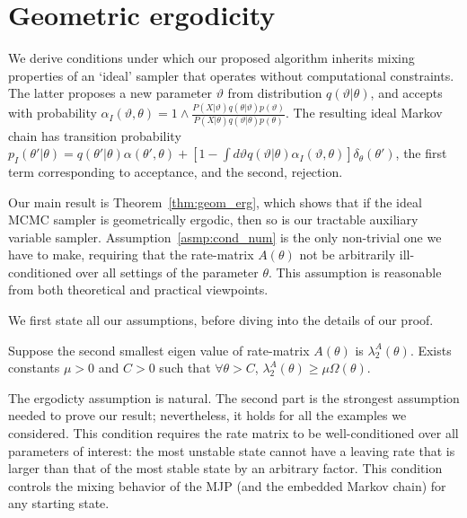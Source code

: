 \newpage
\section{Geometric ergodicity}
We derive conditions under which our proposed algorithm
inherits mixing properties of an `ideal' sampler that operates without
computational constraints. The latter proposes a new parameter $\vartheta$
from distribution $q(\vartheta|\theta)$, and accepts with probability 
$\alpha_I(\vartheta,\theta) = 1 \wedge \frac{P(X | \vartheta)q(\theta| \vartheta)p(\vartheta)}
      {P(X | \theta)q(\vartheta|\theta)p(\theta)}$. The resulting ideal
Markov chain has transition probability 
$p_I(\theta'|\theta) = q(\theta'|\theta)\alpha(\theta',\theta) + \left[1-\int d\vartheta
q(\vartheta|\theta)\alpha_I(\vartheta,\theta)\right]\delta_\theta(\theta')$, the first
term corresponding to acceptance, and the second, rejection.

Our main result is Theorem~\ref{thm:geom_erg}, which shows that if the ideal MCMC 
sampler is geometrically ergodic, then so is our tractable auxiliary
variable sampler. Assumption~\ref{asmp:cond_num} is the only non-trivial 
one we have to make, requiring that the rate-matrix $A(\theta)$ not be 
arbitrarily ill-conditioned over all
settings of the parameter $\theta$. This assumption is reasonable from
both theoretical and practical viewpoints.

We first state all our assumptions, before diving into the details
of our proof.
\begin{assumption}
	Suppose the second smallest eigen value of rate-matrix  $A(\theta)$ is $\lambda ^A_2(\theta)$. Exists constants $\mu > 0$ and $C > 0$ such that 
	$\forall \theta > C$,  $ \lambda ^A_2(\theta) \geq \mu \Omega(\theta)$.
  \label{asmp:cond_num}
\end{assumption}
\noindent The ergodicty assumption is natural. The second part is the
strongest assumption needed to prove our result; nevertheless, it holds 
for all the examples we considered. This condition requires the rate 
matrix to be well-conditioned over all parameters of interest: the most 
unstable state cannot have a leaving rate that is larger than that of
the most stable state by an arbitrary factor. This condition controls the
mixing behavior of the MJP (and the embedded Markov chain) for any 
starting state. 

